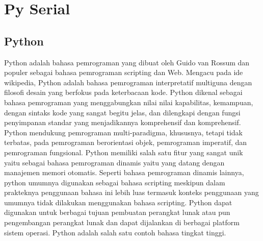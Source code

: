 \section{Py Serial}

	\subsection{Python}
	Python adalah bahasa pemrograman yang dibuat oleh Guido van Rossum dan populer sebagai bahasa pemrograman scripting dan Web. Mengacu pada ide wikipedia, Python adalah bahasa pemrograman interpretatif multiguna dengan filosofi desain yang berfokus pada keterbacaan kode. 
	Python dikenal sebagai bahasa pemrograman yang menggabungkan nilai nilai kapabilitas, kemampuan, dengan sintaks kode yang sangat begitu jelas, dan dilengkapi dengan fungsi penyimpanan standar yang menjadikannya komprehensif dan komprehensif. 
	Python mendukung pemrograman multi-paradigma, khususnya, tetapi tidak terbatas, pada pemrograman berorientasi objek, pemrograman imperatif, dan pemrograman fungsional. 
	Python memiliki salah satu fitur yang sangat unik yaitu sebagai bahasa pemrograman dinamis yaitu yang datang dengan manajemen memori otomatis. Seperti bahasa 
	pemrograman dinamis lainnya, python umumnya digunakan sebagai bahasa scripting meskipun dalam prakteknya penggunaan bahasa ini lebih luas termasuk konteks penggunaan yang umumnya tidak dilakukan menggunakan bahasa scripting. 
	Python dapat digunakan untuk berbagai tujuan pembuatan perangkat lunak atau pun pengembangan perangkat lunak dan dapat dijalankan di berbagai platform sistem operasi. Python adalah salah satu contoh bahasa tingkat tinggi. 
